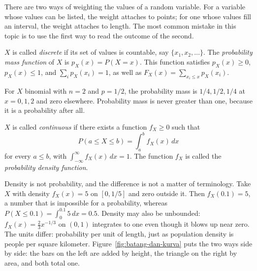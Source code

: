 There are two ways of weighting the values of a random variable. For a variable whose values can
be listed, the weight attaches to points; for one whose values fill an interval, the weight attaches
to length. The most common mistake in this topic is to use the first way to
read the outcome of the second.

\begin{definisi}
$X$ is called \emph{discrete} if its set of values is countable, say
$\{x_1,x_2,\dots\}$. The \emph{probability mass function} of $X$ is $p_X(x)=P(X=x)$.
This function satisfies $p_X(x)\ge0$, $p_X(x)\le1$, and $\sum_i p_X(x_i)=1$, as well as
$F_X(x)=\sum_{x_i\le x}p_X(x_i)$.
\end{definisi}

For $X$ binomial with $n=2$ and $p=1/2$, the probability mass is $1/4,1/2,1/4$ at
$x=0,1,2$ and zero elsewhere. Probability mass is never greater than one,
because it is a probability after all.

\begin{definisi}
$X$ is called \emph{continuous} if there exists a function $f_X\ge0$ such that
\[
P(a\le X\le b)=\int_a^b f_X(x)\,dx
\]
for every $a\le b$, with $\int_{-\infty}^{\infty}f_X(x)\,dx=1$. The function $f_X$
is called the \emph{probability density function}.
\end{definisi}

Density is not probability, and the difference is not a matter of terminology. Take $X$ with
density $f_X(x)=5$ on $[0,1/5]$ and zero outside it. Then $f_X(0.1)=5$, a number
that is impossible for a probability, whereas
$P(X\le0.1)=\int_0^{0.1}5\,dx=0.5$. Density may also be unbounded:
$f_X(x)=\tfrac23x^{-1/3}$ on $(0,1)$ integrates to one even though it blows up near zero.
The units differ: probability per unit of length, just as population density is people
per square kilometer. Figure~\ref{fig:batang-dan-kurva} puts
the two ways side by side: the bars on the left are added by height, the triangle on the
right by area, and both total one.

